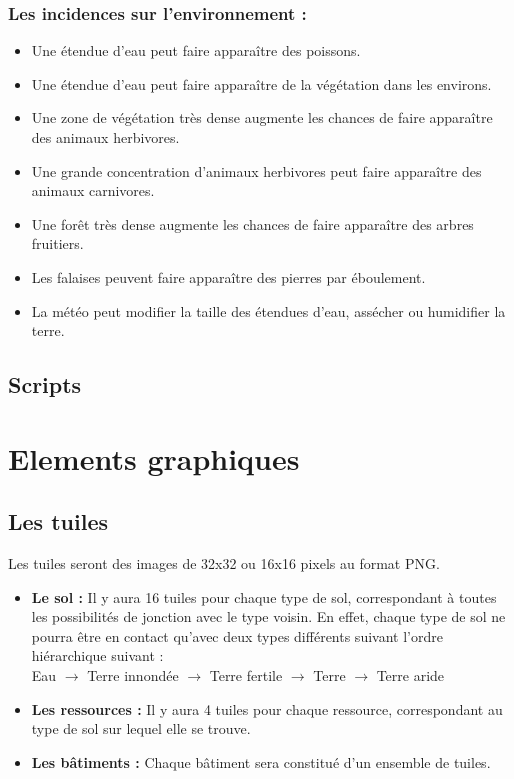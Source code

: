 \documentclass[a4paper]{article}
\newcommand{\alinea}{\hspace*{0.5cm}}
\begin{document}
        \subsubsection{Les incidences sur l'environnement :}
          \begin{itemize} \small
            \item Une étendue d'eau peut faire apparaître des poissons.
            \item Une étendue d'eau peut faire apparaître de la végétation dans les environs.
            \item Une zone de végétation très dense augmente les chances de faire apparaître des animaux herbivores.
            \item Une grande concentration d'animaux herbivores peut faire apparaître des animaux carnivores.
            \item Une forêt très dense augmente les chances de faire apparaître des arbres fruitiers.
            \item Les falaises peuvent faire apparaître des pierres par éboulement.
            \item La météo peut modifier la taille des étendues d'eau, assécher ou humidifier la terre.
          \end{itemize} \normalsize
        
      \subsection{Scripts}
      
    \section{Elements graphiques}

      \subsection{Les tuiles}
        \label{Tuile}
        \alinea Les tuiles seront des images de 32x32 ou 16x16 pixels au format PNG.\\
        \begin{itemize} \small
          \item \textbf{Le sol :} Il y aura 16 tuiles pour chaque type de sol, correspondant à toutes les possibilités de jonction avec le type voisin. En effet, chaque type de sol ne pourra être en contact qu'avec deux types différents suivant l'ordre hiérarchique suivant :\\
          Eau $\rightarrow$ Terre innondée $\rightarrow$ Terre fertile $\rightarrow$ Terre $\rightarrow$ Terre aride
          \item \textbf{Les ressources :} Il y aura 4 tuiles pour chaque ressource, correspondant au type de sol sur lequel elle se trouve.
          \item \textbf{Les bâtiments :} Chaque bâtiment sera constitué d'un ensemble de tuiles.
        \end{itemize} \normalsize
  
\end{document}
